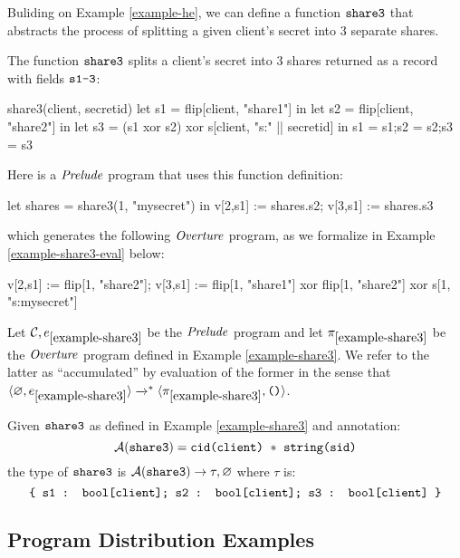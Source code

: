 Buliding on Example \ref{example-he}, we can define a function
$\texttt{share3}$ that abstracts the process of splitting a given
client's secret into 3 separate shares.
\begin{example} \label{example-share3} The function $\texttt{share3}$ 
  splits a client's secret into 3 shares returned as a record
  with fields $\texttt{s1-3}$:
  {\small
  \begin{verbatimtab}
      share3(client, secretid) {
        let s1 = flip[client, "share1"] in
        let s2 = flip[client, "share2"] in
        let s3 = (s1 xor s2) xor s[client, "s:" || secretid] in
        {s1 = s1;s2 = s2;s3 = s3}
      } \end{verbatimtab}
  }
  Here is a $\mathit{Prelude}$ program that uses this function definition:
  {\small
    \begin{verbatimtab}
      let shares = share3(1, "mysecret") in
      v[2,s1] := shares.s2;
      v[3,s1] := shares.s3 \end{verbatimtab}
  }
  which generates the following $\mathit{Overture}$ program, as we formalize in Example \ref{example-share3-eval}
  below:
  {\small
  \begin{verbatimtab}
      v[2,s1] := flip[1, "share2"];
      v[3,s1] := flip[1, "share1"] xor flip[1, "share2"] xor s[1, "s:mysecret"] \end{verbatimtab}
  }
\end{example}

\begin{example}
  \label{example-share3-eval}
  Let $\mathcal{C},e_{\ref{example-share3}}$ be the $\mathit{Prelude}$ program and let 
  $\pi_{\ref{example-share3}}$ be the  $\mathit{Overture}$ program defined
  in Example \ref{example-share3}. We refer to the latter as ``accumulated''
  by evaluation of the former in the sense that $\langle \varnothing,e_{\ref{example-share3}} \rangle
  \xrightarrow{}^{*} \langle \pi_{\ref{example-share3}},\texttt{()} \rangle$.
\end{example}

\begin{example}
  Given $\texttt{share3}$ as defined in Example \ref{example-share3} and
  annotation:
  $$\tas(\ttt{share3}) =  \ttt{cid(client)}\ *\ \ttt{string(sid)}$$
  the type of $\texttt{share3}$ is $\mathcal{A}(\texttt{share3}) \rightarrow \tau,\varnothing$
  where $\tau$ is:
  $$
  \texttt{\{ s1 : bool[client]; s2 : bool[client]; s3 : bool[client] \}}
  $$
\end{example}

\subsection{Program Distribution Examples}
\label{section-pmf-examples}

